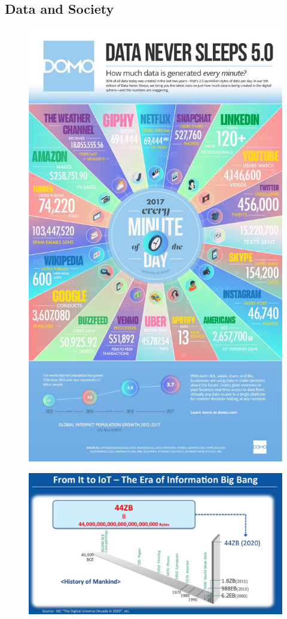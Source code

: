 \subsection{Data and Society}
\begin{figure}[ht]
 \centering
    \includegraphics[width = 8 cm]{./viz/ext/dataeachday2017.jpg}
\end{figure}
\begin{figure}[ht]
 \centering
    \includegraphics[width = 10 cm]{./viz/ext/DataVolumesVSHumanHistory.jpeg}
\end{figure}

